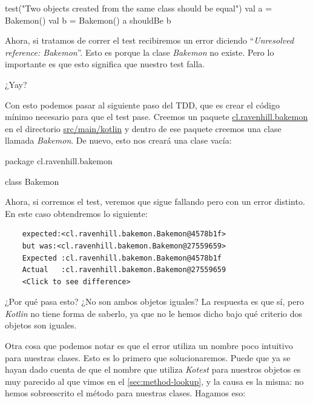   \begin{kotlin}
    test("Two objects created from the same class should be equal") {
      val a = Bakemon()
      val b = Bakemon()
      a shouldBe b
    }
  \end{kotlin}

  Ahora, si tratamos de correr el test recibiremos un error diciendo 
  \enquote{\textit{Unresolved reference: Bakemon}}.
  Esto es porque la clase \textit{Bakemon} no existe.
  Pero lo importante es que esto significa que nuestro test falla.

  \begin{center}
    ¿Yay?
  \end{center}

  Con esto podemos pasar al siguiente paso del TDD, que es crear el código mínimo necesario para que
  el test pase.
  Creemos un paquete \url{cl.ravenhill.bakemon} en el directorio \url{src/main/kotlin} y dentro de
  ese paquete creemos una clase llamada \textit{Bakemon}.
  De nuevo, esto nos creará una clase vacía:

  \begin{kotlin}
    package cl.ravenhill.bakemon

    class Bakemon {
    }
  \end{kotlin}

  Ahora, si corremos el test, veremos que sigue fallando pero con un error distinto.
  En este caso obtendremos lo siguiente:

  \begin{verbatim}
    expected:<cl.ravenhill.bakemon.Bakemon@4578b1f> 
    but was:<cl.ravenhill.bakemon.Bakemon@27559659>
    Expected :cl.ravenhill.bakemon.Bakemon@4578b1f
    Actual   :cl.ravenhill.bakemon.Bakemon@27559659
    <Click to see difference>
  \end{verbatim}
  
  ¿Por qué pasa esto?
  ¿No son ambos objetos iguales?
  La respuesta es que sí, pero \textit{Kotlin} no tiene forma de saberlo, ya que no le hemos dicho
  bajo qué criterio dos objetos son iguales.

  Otra cosa que podemos notar es que el error utiliza un nombre poco intuitivo para nuestras clases.
  Esto es lo primero que solucionaremos.
  Puede que ya se hayan dado cuenta de que el nombre que utiliza \textit{Kotest} para nuestros 
  objetos es muy parecido al que vimos en el \cref{sec:method-lookup}, y la causa es la misma: no
  hemos sobreescrito el método  para nuestras clases.
  Hagamos eso:

